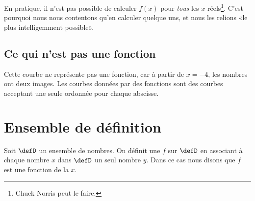 En pratique, il n'est pas possible de calculer \( f(x)\) pour \emph{tous} les \( x\) réels\footnote{Chuck Norris peut le faire.}. C'est pourquoi nous nous contentons qu'en calculer quelque uns, et nous les relions «le plus intelligemment possible».



\subsection{Ce qui n'est pas une fonction}


\begin{multicols}{2}
    Cette courbe ne représente pas une fonction, car à partir de \( x=-4\), les nombres ont deux images. Les courbes données par des fonctions sont des courbes acceptant une seule ordonnée pour chaque abscisse.

\columnbreak




\end{multicols}


\section{Ensemble de définition}

\begin{definition}
    Soit \( \defD\) un ensemble de nombres. On définit une  \( f\) sur \( \defD\) en associant à chaque nombre \( x\) dans \( \defD\) un seul nombre \( y\). Dans ce cas nous disons que \( f\) est une fonction de la  \( x\).
\end{definition}

